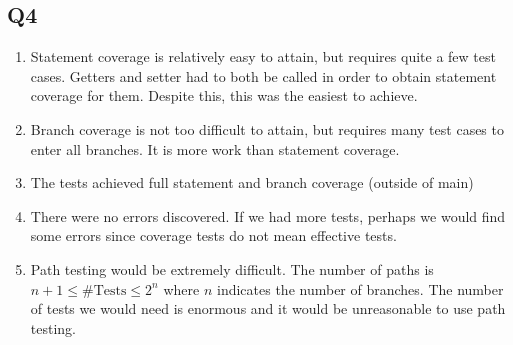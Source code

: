 \documentclass[12pt, letterpaper, titlepage]{article}
\begin{document}
\subsection*{Q4}
\begin{enumerate}
    \item Statement coverage is relatively easy to attain, but requires quite a few test cases. Getters and setter had to both be called in order to obtain statement coverage for them. Despite this, this was the easiest to achieve.
    \item Branch coverage is not too difficult to attain, but requires many test cases to enter all branches. It is more work than statement coverage.
    \item The tests achieved full statement and branch coverage (outside of main)
    \item There were no errors discovered. If we had more tests, perhaps we would find some errors since coverage tests do not mean effective tests.
    \item Path testing would be extremely difficult. The number of paths is $n+1 \leq \text{\#Tests} \leq 2^n$ where $n$ indicates the number of branches. The number of tests we would need is enormous and it would be unreasonable to use path testing.
\end{enumerate}
\end{document}
